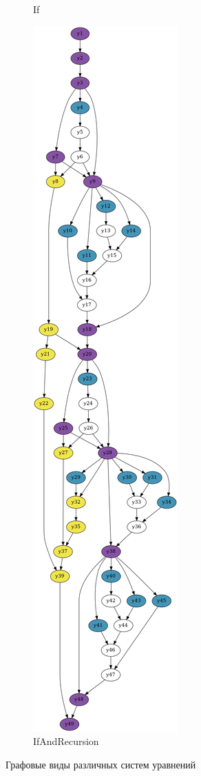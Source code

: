 \documentclass[../thesis.tex]{subfiles}
\begin{document}
\begin{figure}[htbp]
\begin{adjustwidth}{-2cm}{-2cm}
\begin{subfigure}{0.28\textwidth}
    \caption{If}
    \end{subfigure}
    \begin{subfigure}{0.28\textwidth}
      \centering
    \includegraphics[width=\textwidth]{graph_ifrec2.png}
    \caption{IfAndRecursion}
    \end{subfigure}
    \caption{Графовые виды различных систем уравнений}
    \label{all_graphs}
  \end{adjustwidth}
\end{figure}
\end{document}
